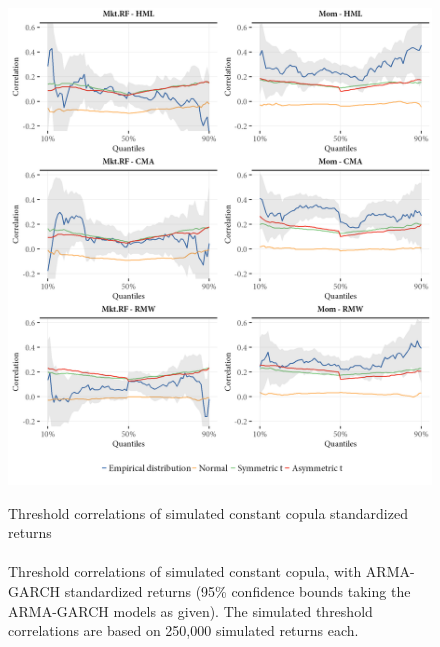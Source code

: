 \begin{figure}[!ht]
  \centering
  \caption{Threshold correlations of simulated constant copula standardized returns \\ \quad \\ Threshold correlations of simulated constant copula, with ARMA-GARCH standardized returns (95\% confidence bounds taking the ARMA-GARCH models as given). The simulated threshold correlations are based on 250,000 simulated returns each.}
  \includegraphics[scale=1]{graphics/threshold_simulated_1.png}  
  \label{fig:threshold_simulated1}
\end{figure}
